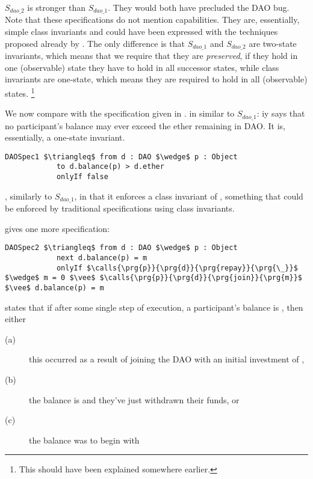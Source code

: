 $S_{dao\_2}$  is stronger than $S_{dao\_1}$. They would both have precluded the DAO bug. Note that these specifications  do not mention capabilities. 
They are, essentially, simple class invariants and could have been expressed with the techniques proposed already by \cite{MeyerDBC92}.
The only difference is that $S_{dao\_1}$ and $S_{dao\_2}$ are two-state invariants, which means that we require that they are \emph{preserved},
\ie if they hold in one (observable) state they have to hold in all successor states,
while class invariants are one-state, which means they are required to hold in all (observable) states.
\footnote{This should have been explained somewhere earlier.}

\vspace{0.5cm}
We now compare with the specification given in \cite{OOPSLA22}.
 in similar to  $S_{dao\_1}$: iy
says that no participant's balance may ever exceed the ether remaining 
in DAO. It is, essentially, a one-state invariant.


\begin{lstlisting}[language = Chainmail, mathescape=true, frame=lines]
DAOSpec1 $\triangleq$ from d : DAO $\wedge$ p : Object
            to d.balance(p) > d.ether
            onlyIf false
\end{lstlisting}
, similarly to $S_{dao\_1}$,   in that it enforces a class invariant of , something that could be enforced
by traditional specifications using class invariants.


 \cite{OOPSLA22}  gives one more   specification: 
 
 \begin{lstlisting}[language = Chainmail, mathescape=true, frame=lines]
DAOSpec2 $\triangleq$ from d : DAO $\wedge$ p : Object
            next d.balance(p) = m
            onlyIf $\calls{\prg{p}}{\prg{d}}{\prg{repay}}{\prg{\_}}$ $\wedge$ m = 0 $\vee$ $\calls{\prg{p}}{\prg{d}}{\prg{join}}{\prg{m}}$ $\vee$ d.balance(p) = m
\end{lstlisting}

  states that if after some single step of execution, a participant's balance is , then 
either 
\begin{description}
\item[(a)] this occurred as a result of joining the DAO with an initial investment of , 
\item[(b)] the balance is  and they've just withdrawn their funds, or 
\item[(c) ]the balance was  to begin with
\end{description}

